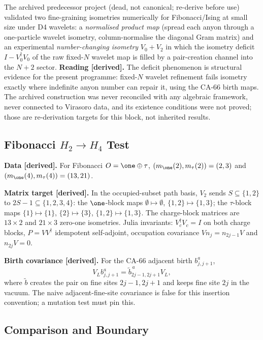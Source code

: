 The archived predecessor project (dead, not canonical; re-derive before use)
validated two fine-graining isometries numerically for Fibonacci/Ising at
small size under D4 wavelets: a \emph{normalised product map} (spread each
anyon through a one-particle wavelet isometry, column-normalise the diagonal
Gram matrix) and an experimental \emph{number-changing isometry} \(V_0+V_2\)
in which the isometry deficit \(I-V_0^\dagger V_0\) of the raw fixed-\(N\)
wavelet map is filled by a pair-creation channel into the \(N{+}2\) sector.
\textbf{Reading [derived].}  The deficit phenomenon is structural evidence for
the present programme: fixed-\(N\) wavelet refinement fails isometry exactly
where indefinite anyon number can repair it, using the CA-66 birth maps.  The
archived construction was never reconciled with any algebraic framework,
never connected to Virasoro data, and its existence conditions were not
proved; those are re-derivation targets for this block, not inherited results.

\subsection{Fibonacci \(H_2\to H_4\) Test}

\textbf{Data [derived].}  For Fibonacci \(O=\one\oplus\tau\),
\((m_{\one}(2),m_{\tau}(2))=(2,3)\) and
\((m_{\one}(4),m_{\tau}(4))=(13,21)\).

\textbf{Matrix target [derived].}  In the occupied-subset path basis, \(V_2\)
sends \(S\subseteq\{1,2\}\) to \(2S-1\subseteq\{1,2,3,4\}\): the \(\one\)-block
maps \(\emptyset\mapsto\emptyset\), \(\{1,2\}\mapsto\{1,3\}\); the
\(\tau\)-block maps \(\{1\}\mapsto\{1\}\), \(\{2\}\mapsto\{3\}\),
\(\{1,2\}\mapsto\{1,3\}\).  The charge-block matrices are \(13\times2\) and
\(21\times3\) zero-one isometries.  Julia invariants: \(V_c^\dagger V_c=I\)
on both charge blocks, \(P=VV^\dagger\) idempotent self-adjoint, occupation
covariance \(Vn_j=n_{2j-1}V\) and \(n_{2j}V=0\).

\textbf{Birth covariance [derived].}  For the CA-66 adjacent birth
\(b^a_{j,j+1}\),
\[
  V_Lb^a_{j,j+1}=\widetilde b^{\,a}_{2j-1,2j+1}V_L,
\]
where \(\widetilde b\) creates the pair on fine sites \(2j-1,2j+1\) and keeps
fine site \(2j\) in the vacuum.  The naive adjacent-fine-site covariance is
false for this insertion convention; a mutation test must pin this.

\subsection{Comparison and Boundary}

